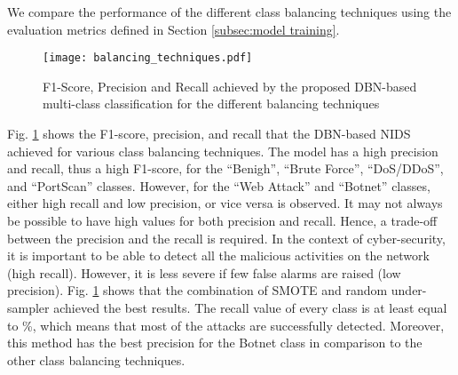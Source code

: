\documentclass[runningheads]{llncs}
\begin{document}
We compare the performance of the different class balancing techniques using the evaluation metrics defined in Section \ref{subsec:model training}.

\begin{figure}[ht]
    \centering
    \texttt{[image: balancing\_techniques.pdf]}
    \caption{F1-Score, Precision and Recall achieved by the proposed \ac{DBN}-based multi-class classification for the different balancing techniques}
    \label{fig:balancing_techniques_eval}
\end{figure}

Fig. \ref{fig:balancing_techniques_eval} shows the F1-score, precision, and recall that the \ac{DBN}-based NIDS achieved for various class balancing techniques. The model has a high precision and recall, thus a high F1-score, for the ``Benigh'', ``Brute Force'', ``DoS/DDoS'', and ``PortScan'' classes. However, for the ``Web Attack'' and ``Botnet'' classes, either high recall and low precision, or vice versa is observed. It may not always be possible to have high values for both precision and recall. Hence, a trade-off between the precision and the recall is required. In the context of cyber-security, it is important to be able to detect all the malicious activities on the network (high recall). However, it is less severe if few false alarms are raised (low precision). Fig. \ref{fig:balancing_techniques_eval} shows that the combination of \ac{SMOTE} and random under-sampler achieved the best results. The recall value of every class is at least equal to \%, which means that most of the attacks are successfully detected. Moreover, this method has the best precision for the Botnet class in comparison to the other class balancing techniques.
\end{document}
